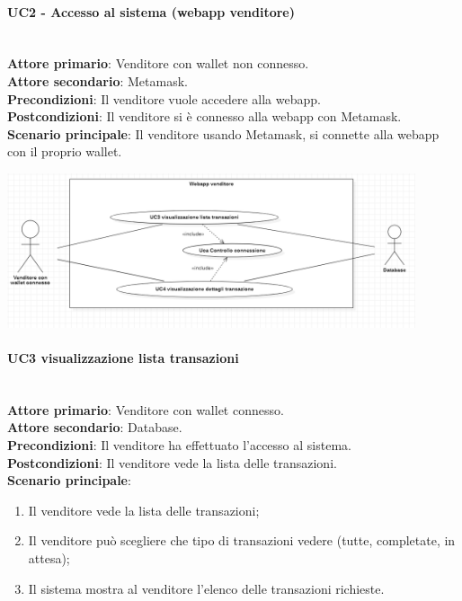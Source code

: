 \documentclass[a4paper, 12pt]{article}
\begin{document}
\paragraph{UC2 - Accesso al sistema (webapp venditore)}\\
\textbf{Attore primario}: Venditore con wallet non connesso.\\
\textbf{Attore secondario}: Metamask.\\
\textbf{Precondizioni}: Il venditore vuole accedere alla webapp.\\
\textbf{Postcondizioni}: Il venditore si è connesso alla webapp con Metamask.\\
\textbf{Scenario principale}:
Il venditore usando Metamask, si connette alla webapp con il proprio wallet.

\includegraphics[width=0.9\textwidth]{UC_WAV3}

\paragraph{UC3 visualizzazione lista transazioni}\\
\textbf{Attore primario}: Venditore con wallet connesso. \\
\textbf{Attore secondario}: Database. \\
\textbf{Precondizioni}: Il venditore ha effettuato l'accesso al sistema.\\
\textbf{Postcondizioni}:  Il venditore vede la lista delle transazioni.\\
\textbf{Scenario principale}:
\begin{enumerate}
\item Il venditore vede la lista delle transazioni;
\item Il venditore può scegliere che tipo di transazioni vedere (tutte, completate, in attesa);
\item Il sistema mostra al venditore l'elenco delle transazioni richieste.
\end{enumerate}
\end{document}
